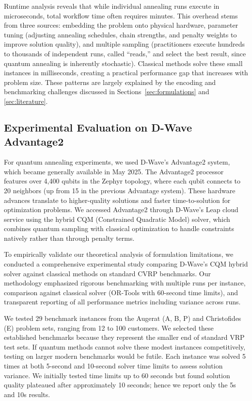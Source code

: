 \documentclass[preprint,3p,12pt,authoryear]{elsarticle}
\begin{document}
Runtime analysis reveals that while individual annealing runs execute in microseconds, total workflow time often requires minutes. This overhead stems from three sources: embedding the problem onto physical hardware, parameter tuning (adjusting annealing schedules, chain strengths, and penalty weights to improve solution quality), and multiple sampling (practitioners execute hundreds to thousands of independent runs, called ``reads,'' and select the best result, since quantum annealing is inherently stochastic). Classical methods solve these small instances in milliseconds, creating a practical performance gap that increases with problem size. These patterns are largely explained by the encoding and benchmarking challenges discussed in Sections~\ref{sec:formulations} and \ref{sec:literature}.

\subsection{Experimental Evaluation on D-Wave Advantage2}

For quantum annealing experiments, we used D-Wave's Advantage2 system, which became generally available in May 2025. The Advantage2 processor features over 4,400 qubits in the Zephyr topology, where each qubit connects to 20 neighbors (up from 15 in the previous Advantage system). These hardware advances translate to higher-quality solutions and faster time-to-solution for optimization problems. We accessed Advantage2 through D-Wave's Leap cloud service using the hybrid CQM (Constrained Quadratic Model) solver, which combines quantum sampling with classical optimization to handle constraints natively rather than through penalty terms.

To empirically validate our theoretical analysis of formulation limitations, we conducted a comprehensive experimental study comparing D-Wave's CQM hybrid solver against classical methods on standard CVRP benchmarks. Our methodology emphasized rigorous benchmarking with multiple runs per instance, comparison against classical solver (OR-Tools with 60-second time limits), and transparent reporting of all performance metrics including variance across runs.

We tested 29 benchmark instances from the Augerat (A, B, P) \citep{augerat1995computational} and Christofides (E) \citep{christofides1969algorithm} problem sets, ranging from 12 to 100 customers. We selected these established benchmarks because they represent the smaller end of standard VRP test sets. If quantum methods cannot solve these modest instances competitively, testing on larger modern benchmarks would be futile. Each instance was solved 5 times at both 5-second and 10-second solver time limits to assess solution variance. We initially tested time limits up to 60 seconds but found solution quality plateaued after approximately 10 seconds; hence we report only the 5s and 10s results.
\end{document}
